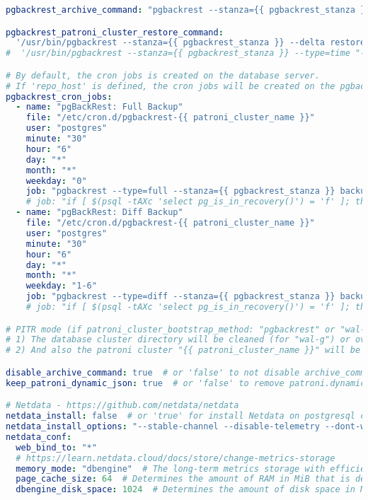 \begin{flushleft}
\begin{lstlisting}[language=yaml, caption=Testsystem - Deployment - main.yml,captionpos=b,label={lst:testsystem-deployment-main.yml},breaklines=true]
pgbackrest_archive_command: "pgbackrest --stanza={{ pgbackrest_stanza }} archive-push %p"

pgbackrest_patroni_cluster_restore_command:
  '/usr/bin/pgbackrest --stanza={{ pgbackrest_stanza }} --delta restore'  # restore from latest backup
#  '/usr/bin/pgbackrest --stanza={{ pgbackrest_stanza }} --type=time "--target=2020-06-01 11:00:00+03" --delta restore'  # Point-in-Time Recovery (example)

# By default, the cron jobs is created on the database server.
# If 'repo_host' is defined, the cron jobs will be created on the pgbackrest server.
pgbackrest_cron_jobs:
  - name: "pgBackRest: Full Backup"
    file: "/etc/cron.d/pgbackrest-{{ patroni_cluster_name }}"
    user: "postgres"
    minute: "30"
    hour: "6"
    day: "*"
    month: "*"
    weekday: "0"
    job: "pgbackrest --type=full --stanza={{ pgbackrest_stanza }} backup"
    # job: "if [ $(psql -tAXc 'select pg_is_in_recovery()') = 'f' ]; then pgbackrest --type=full --stanza={{ pgbackrest_stanza }} backup; fi"
  - name: "pgBackRest: Diff Backup"
    file: "/etc/cron.d/pgbackrest-{{ patroni_cluster_name }}"
    user: "postgres"
    minute: "30"
    hour: "6"
    day: "*"
    month: "*"
    weekday: "1-6"
    job: "pgbackrest --type=diff --stanza={{ pgbackrest_stanza }} backup"
    # job: "if [ $(psql -tAXc 'select pg_is_in_recovery()') = 'f' ]; then pgbackrest --type=diff --stanza={{ pgbackrest_stanza }} backup; fi"

# PITR mode (if patroni_cluster_bootstrap_method: "pgbackrest" or "wal-g"):
# 1) The database cluster directory will be cleaned (for "wal-g") or overwritten (for "pgbackrest" --delta restore).
# 2) And also the patroni cluster "{{ patroni_cluster_name }}" will be removed from the DCS (if exist) before recovery.

disable_archive_command: true  # or 'false' to not disable archive_command after restore
keep_patroni_dynamic_json: true  # or 'false' to remove patroni.dynamic.json after restore (if exists)

# Netdata - https://github.com/netdata/netdata
netdata_install: false  # or 'true' for install Netdata on postgresql cluster nodes (with kickstart.sh)
netdata_install_options: "--stable-channel --disable-telemetry --dont-wait"
netdata_conf:
  web_bind_to: "*"
  # https://learn.netdata.cloud/docs/store/change-metrics-storage
  memory_mode: "dbengine"  # The long-term metrics storage with efficient RAM and disk usage.
  page_cache_size: 64  # Determines the amount of RAM in MiB that is dedicated to caching Netdata metric values.
  dbengine_disk_space: 1024  # Determines the amount of disk space in MiB that is dedicated to storing Netdata metric values.


\end{lstlisting}
\end{flushleft}
